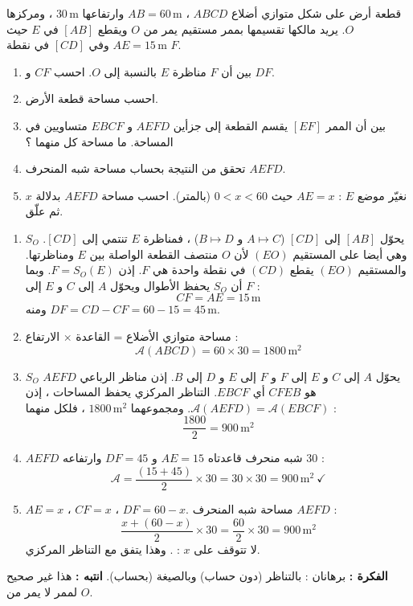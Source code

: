 \documentclass[12pt,a4paper]{article}
\begin{document}
\begin{corr}[title={تقسيم قطعة أرض}, stars=4, source={Axiomaths}]
قطعة أرض على شكل متوازي أضلاع $ABCD$ ، $AB=60\,\mathrm{m}$ وارتفاعها $30\,\mathrm{m}$ ، ومركزها $O$. يريد مالكها تقسيمها بممر مستقيم يمر من $O$ ويقطع $[AB]$ في $E$ حيث $AE=15\,\mathrm{m}$ وفي $[CD]$ في نقطة $F$.
\begin{center}
\end{center}
\begin{enumerate}
  \item بين أن $F$ مناظرة $E$ بالنسبة إلى $O$. احسب $CF$ و $DF$.
  \item احسب مساحة قطعة الأرض.
  \item بين أن الممر $[EF]$ يقسم القطعة إلى جزأين $AEFD$ و $EBCF$ متساويين في المساحة. ما مساحة كل منهما ؟
  \item تحقق من النتيجة بحساب مساحة شبه المنحرف $AEFD$.
  \item نغيّر موضع $E$ : $AE=x$ حيث $0<x<60$ (بالمتر). احسب مساحة $AEFD$ بدلالة $x$ ثم علّق.
\end{enumerate}
\axsol
\begin{enumerate}[itemsep=14pt]
  \item $S_O$ يحوّل $[AB]$ إلى $[CD]$ ($A\mapsto C$ و $B\mapsto D$) ، فمناظرة $E$ تنتمي إلى $[CD]$. وهي أيضا على المستقيم $(EO)$ لأن $O$ منتصف القطعة الواصلة بين $E$ ومناظرتها. والمستقيم $(EO)$ يقطع $(CD)$ في نقطة واحدة هي $F$. إذن $F=S_O(E)$.
  وبما أن $S_O$ يحفظ الأطوال ويحوّل $A$ إلى $C$ و $E$ إلى $F$ :
  \[CF=AE=15\,\mathrm{m}\]
  ومنه $DF=CD-CF=60-15=45\,\mathrm{m}$.
  \item مساحة متوازي الأضلاع = القاعدة $\times$ الارتفاع :
  \[\mathcal{A}(ABCD)=60\times30=1800\,\mathrm{m}^2\]
  \item $S_O$ يحوّل $A$ إلى $C$ و $E$ إلى $F$ و $F$ إلى $E$ و $D$ إلى $B$. إذن مناظر الرباعي $AEFD$ هو $CFEB$ أي $EBCF$. التناظر المركزي يحفظ المساحات ، إذن $\mathcal{A}(AEFD)=\mathcal{A}(EBCF)$. ومجموعهما $1800\,\mathrm{m}^2$ ، فلكل منهما :
  \[\dfrac{1800}{2}=900\,\mathrm{m}^2\]
  \item $AEFD$ شبه منحرف قاعدتاه $AE=15$ و $DF=45$ وارتفاعه $30$ :
  \[\mathcal{A}=\dfrac{(15+45)}{2}\times30=30\times30=900\,\mathrm{m}^2\ \checkmark\]
  \item $AE=x$ ، $CF=x$ ، $DF=60-x$. مساحة شبه المنحرف $AEFD$ :
  \[\dfrac{x+(60-x)}{2}\times30=\dfrac{60}{2}\times30=900\,\mathrm{m}^2\]
  لا تتوقف على $x$ : . وهذا يتفق مع التناظر المركزي.
\end{enumerate}
\textbf{الفكرة :} برهانان : بالتناظر (دون حساب) وبالصيغة (بحساب). \quad \textbf{انتبه :} هذا غير صحيح لممر لا يمر من $O$.
\end{corr}
\end{document}
